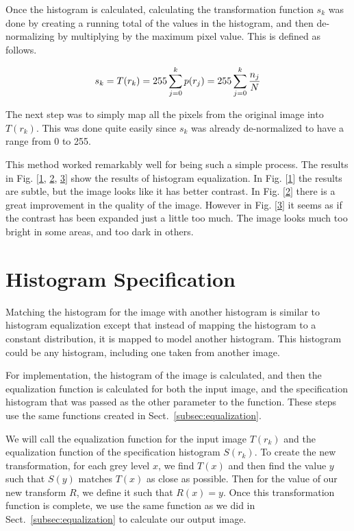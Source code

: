   Once the histogram is calculated, calculating the transformation function $s_k$ was done by
  creating a running total of the values in the histogram, and then de-normalizing by multiplying
  by the maximum pixel value.  This is defined as follows.

  \[
    s_k=T(r_k)=255 \sum_{j=0}^{k}p(r_j) =255 \sum_{j=0}^{k} {n_j \over N}
  \]

  The next step was to simply map all the pixels from the original image into $T(r_k)$.  This was
  done quite easily since $s_k$ was already de-normalized to have a range from 0 to 255.
  
  This method worked remarkably well for being such a simple process.  The results in Fig.
  $[$\hyperref[fig:lenna_equal]{1}, \hyperref[fig:sf_equal]{2}, \hyperref[fig:lax_equal]{3}$]$ show the results of histogram
  equalization.  In Fig. $[$\hyperref[fig:lenna_equal]{1}$]$ the results are subtle, but the image looks
  like it has better contrast.  In Fig. $[$\hyperref[fig:sf_equal]{2}$]$ there is a great improvement
  in the quality of the image.  However in Fig. $[$\hyperref[fig:lax_equal]{3}$]$ it seems as if the contrast 
  has been expanded just a little too much.  The image looks much too bright in some areas,
  and too dark in others.

  \section{Histogram Specification}
 
  Matching the histogram for the image with another histogram is similar to histogram equalization
  except that instead of mapping the histogram to a constant distribution, it is mapped to model
  another histogram.  This histogram could be any histogram, including one taken from another
  image.

  For implementation, the histogram of the image is calculated, and then the equalization function
  is calculated for both the input image, and the specification histogram that was passed as the other
  parameter to the function.  These steps use the same functions created in Sect.~\ref{subsec:equalization}.

  We will call the equalization function for the input image $T(r_k)$ and the equalization
  function of the specification histogram $S(r_k)$.  To create the new transformation, for each
  grey level $x$, we find $T(x)$ and then find the value $y$ such that $S(y)$ matches $T(x)$ as
  close as possible.  Then for the value of our new transform $R$, we define it such that $R(x)=y$.
  Once this transformation function is complete, we use the same function as we did in Sect.~\ref{subsec:equalization}
  to calculate our output image.


